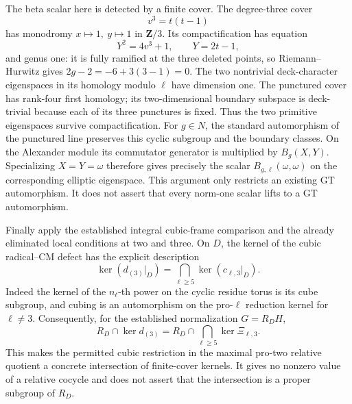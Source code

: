 The beta scalar here is detected by a finite cover.
The degree-three cover
\[
                 v^3=t(t-1)
\]
has monodromy \(x\mapsto1,\ y\mapsto1\) in
\(\mathbf Z/3\). Its compactification has equation
\[
                Y^2=4v^3+1,\qquad Y=2t-1,
\]
and genus one: it is fully ramified at the three deleted points,
so Riemann--Hurwitz gives \(2g-2=-6+3(3-1)=0\).
The two nontrivial deck-character eigenspaces in its homology
modulo \(\ell\) have dimension one. The punctured cover has
rank-four first homology; its two-dimensional boundary subspace
is deck-trivial because each of its three punctures is fixed.
Thus the two primitive eigenspaces survive compactification.
For \(g\in N\), the standard automorphism of the punctured line
preserves this cyclic subgroup and the boundary classes. On the
Alexander module its commutator generator is multiplied by
\(B_g(X,Y)\). Specializing \(X=Y=\omega\) therefore gives precisely
the scalar \(B_{g,\ell}(\omega,\omega)\) on the corresponding
elliptic eigenspace. This argument only restricts an existing
GT automorphism. It does not assert that every norm-one scalar
lifts to a GT automorphism.

Finally apply the established integral cubic-frame comparison
and the already eliminated local conditions at two and three.
On \(D\), the kernel of the cubic radical--CM defect has the
explicit description
\[
 \ker(d_{(3)}|_D)
       =\bigcap_{\ell\ge5}\ker(c_{\ell,3}|_D).
\]
Indeed the kernel of the \(n_\ell\)-th power on the cyclic residue
torus is its cube subgroup, and cubing is an automorphism on the
pro-\(\ell\) reduction kernel for \(\ell\ne3\).
Consequently, for the established normalization \(G=R_DH\),
\[
 R_D\cap\ker d_{(3)}
       =R_D\cap\bigcap_{\ell\ge5}\ker\Xi_{\ell,3}.
\]
This makes the permitted cubic restriction in the maximal
pro-two relative quotient a concrete intersection of finite-cover
kernels. It gives no nonzero value of a relative cocycle and does
not assert that the intersection is a proper subgroup of \(R_D\).

